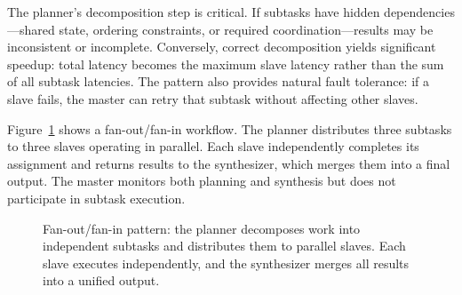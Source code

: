 The planner's decomposition step is critical.
If subtasks have hidden dependencies---shared state, ordering constraints, or required coordination---results may be inconsistent or incomplete.
Conversely, correct decomposition yields significant speedup: total latency becomes the maximum slave latency rather than the sum of all subtask latencies.
The pattern also provides natural fault tolerance: if a slave fails, the master can retry that subtask without affecting other slaves.

Figure~\ref{fig:fanout_pattern} shows a fan-out/fan-in workflow.
The planner distributes three subtasks to three slaves operating in parallel.
Each slave independently completes its assignment and returns results to the synthesizer, which merges them into a final output.
The master monitors both planning and synthesis but does not participate in subtask execution.

\begin{figure}[t]
\centering
{}
\caption{Fan-out/fan-in pattern: the planner decomposes work into independent subtasks and distributes them to parallel slaves. Each slave executes independently, and the synthesizer merges all results into a unified output.}
\label{fig:fanout_pattern}
\end{figure}

